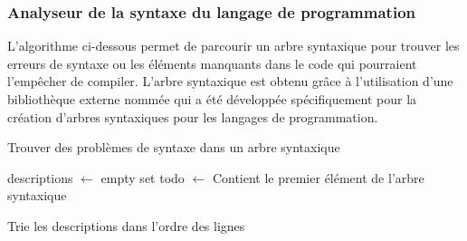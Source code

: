\documentclass{rapport}
\begin{document}
\subsubsection{Analyseur de la syntaxe du langage de programmation}
L'algorithme ci-dessous permet de parcourir un arbre syntaxique pour trouver les erreurs de syntaxe ou les éléments manquants dans le code qui pourraient l'empêcher de compiler. L'arbre syntaxique est obtenu grâce à l'utilisation d'une bibliothèque externe nommée  qui a été développée spécifiquement pour la création d'arbres syntaxiques pour les langages de programmation.\\
\begin{algorithm}[H]
\caption{Trouver des problèmes de syntaxe dans un arbre syntaxique}

descriptions $\leftarrow$ empty set\;
todo $\leftarrow$ Contient le premier élément de l'arbre syntaxique\;


Trie les descriptions dans l'ordre des lignes\;
\;

\end{algorithm}

\newpage
\end{document}

